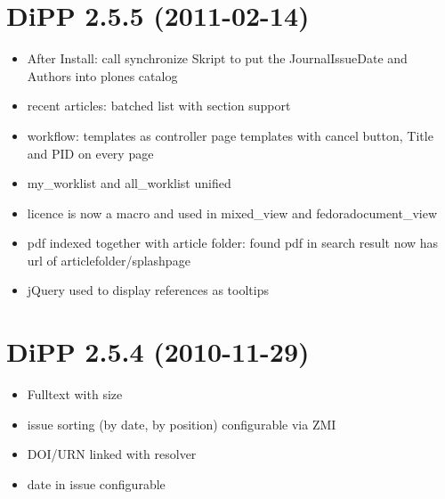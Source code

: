 \documentclass[a4paper,10pt,ngerman]{sphinxmanual}
\begin{document}
\section{DiPP 2.5.5 (2011-02-14)}
\label{changelog:dipp-2-5-5-2011-02-14}\begin{itemize}
\item {} 
After Install: call synchronize Skript to put the JournalIssueDate and
Authors into plones catalog

\item {} 
recent articles: batched list with section support

\item {} 
workflow: templates as controller page templates with cancel button,
Title and PID on every page

\item {} 
my\_worklist and all\_worklist unified

\item {} 
licence is now a macro and used in mixed\_view and fedoradocument\_view

\item {} 
pdf indexed together with article folder: found pdf in search result
now has url of articlefolder/splashpage

\item {} 
jQuery used to display references as tooltips

\end{itemize}


\section{DiPP 2.5.4 (2010-11-29)}
\label{changelog:dipp-2-5-4-2010-11-29}\begin{itemize}
\item {} 
Fulltext with size

\item {} 
issue sorting (by date, by position) configurable via ZMI

\item {} 
DOI/URN linked with resolver

\item {} 
date in issue configurable

\end{itemize}
\end{document}
